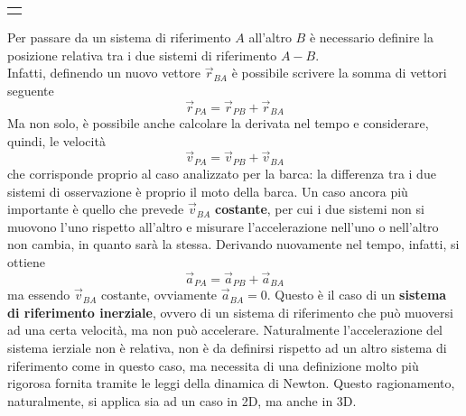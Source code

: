 \documentclass[a4paper]{extarticle}
\begin{document}
\vspace{2em}
\noindent
{}
\begin{tabularx}{\textwidth}{P}
  {
      \centering
  }
\end{tabularx}

\vspace{1em}
\noindent
Per passare da un sistema di riferimento $A$ all'altro $B$ è necessario definire la posizione relativa tra i due sistemi di riferimento $A-B$.\\
Infatti, definendo un nuovo vettore $\vec{r}_{BA}$ è possibile scrivere la somma di vettori seguente
\[\vec{r}_{PA} = \vec{r}_{PB} + \vec{r}_{BA}\]
Ma non solo, è possibile anche calcolare la derivata nel tempo e considerare, quindi, le velocità
\[\vec{v}_{PA} = \vec{v}_{PB} + \vec{v}_{BA}\]
che corrisponde proprio al caso analizzato per la barca: la differenza tra i due sistemi di osservazione è proprio il moto della barca. Un caso ancora più importante è quello che prevede $\vec{v}_{BA}$ \textbf{costante}, per cui i due sistemi non si muovono l'uno rispetto all'altro e misurare l'accelerazione nell'uno o nell'altro non cambia, in quanto sarà la stessa. Derivando nuovamente nel tempo, infatti, si ottiene
\[\vec{a}_{PA} = \vec{a}_{PB} + \vec{a}_{BA}\]
ma essendo $\vec{v}_{BA}$ costante, ovviamente $\vec{a}_{BA} = 0$. Questo è il caso di un \textbf{sistema di riferimento inerziale}, ovvero di un sistema di riferimento che può muoversi ad una certa velocità, ma non può accelerare. Naturalmente l'accelerazione del sistema ierziale non è relativa, non è da definirsi rispetto ad un altro sistema di riferimento come in questo caso, ma necessita di una definizione molto più rigorosa fornita tramite le leggi della dinamica di Newton. Questo ragionamento, naturalmente, si applica sia ad un caso in 2D, ma anche in 3D.
\end{document}
